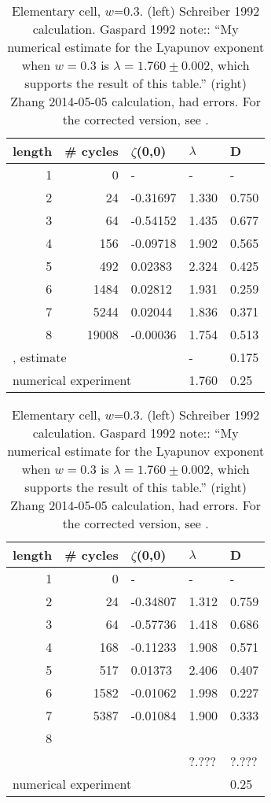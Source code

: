 \begin{description}
\begin{table}
\begin{center}
\begin{tabular}{|r|r|l|l|l|}
\hline
length & \# cycles & $\zeta$(0,0) & $\lambda$ & D \\ \hline\hline
1      & 0      &   -    &   -  &   - \\
2      & 24     & -0.31697 & 1.330 & 0.750\\
3      & 64     & -0.54152 & 1.435 & 0.677\\
4      & 156    & -0.09718 & 1.902 & 0.565\\
5      & 492    &  0.02383 & 2.324 & 0.425\\
6      & 1484   &  0.02812 & 1.931 & 0.259\\
7      & 5244   &  0.02044 & 1.836 & 0.371\\
8      & 19008  & -0.00036 & 1.754 & 0.513\\ \hline\hline
\multicolumn{3}{|l|}{{MacZwa83}, estimate}
                           &   -   & 0.175 \\
\multicolumn{3}{|l|}{numerical experiment}
                           & 1.760 & 0.25
\\ \hline
\end{tabular}
\hfill
\begin{tabular}{|r|r|l|l|l|}
\hline
length & \# cycles & $\zeta$(0,0) & $\lambda$ & D \\ \hline\hline
1      & 0      &   -    &   -  &   - \\
2      & 24     & -0.34807 & 1.312 & 0.759\\
3      & 64     & -0.57736 & 1.418 & 0.686\\
4      & 168    & -0.11233 & 1.908 & 0.571\\
5      & 517    &  0.01373 & 2.406 & 0.407\\
6      & 1582   & -0.01062 & 1.998 & 0.227\\
7      & 5387   & -0.01084 & 1.900 & 0.333\\
8      &        &          &       &       \\
\hline\hline
\multicolumn{3}{|l|}{     }& ?.??? & ?.??? \\
\multicolumn{4}{|l|}{numerical experiment} & 0.25 \\ \hline
\end{tabular}
\caption{\label{TCELL1}
Elementary cell, $w$=0.3.
(left) Schreiber 1992 calculation.
Gaspard 1992 note:: ``My numerical estimate for the Lyapunov exponent
when $w=0.3$ is $\lambda = 1.760 \pm 0.002$, which supports the result of
this table.''
(right) Zhang 2014-05-05 calculation, had errors. For the corrected version, see
.
}
\end{center}
\end{table}


\end{description}
